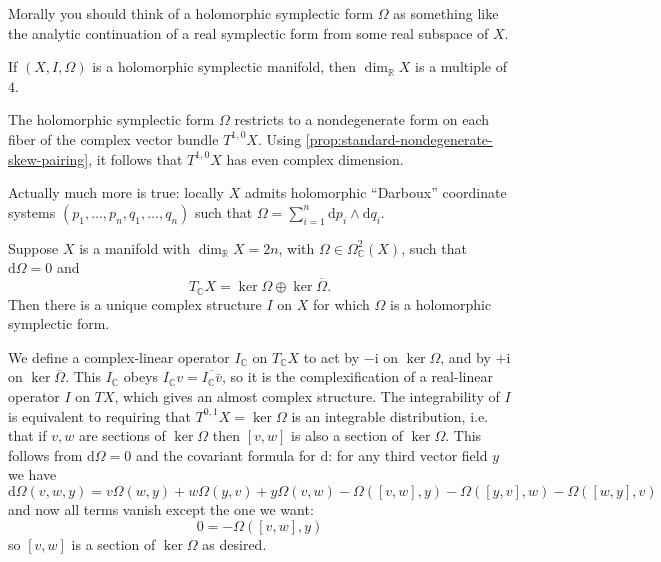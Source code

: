 \documentclass[12pt,letterpaper,reqno]{article}
\numberwithin{equation}{section}
\newcommand{\R}{\ensuremath{\mathbb R}}
\newcommand{\C}{\ensuremath{\mathbb C}}
\newcommand{\I}{{\mathrm i}}
\newcommand{\de}{\mathrm{d}}
\begin{document}
Morally you should think of a holomorphic symplectic form $\Omega$
as something like the analytic continuation of a real 
symplectic form from some real subspace of $X$.

\begin{prop} 
\label{prop:hol-symp-dimension-4n} If $(X,I,\Omega)$ is a holomorphic symplectic manifold,
then $\dim_\R X$ is a multiple of $4$.
\end{prop} 
\begin{pf} The holomorphic symplectic form $\Omega$ restricts to a nondegenerate form on each fiber of the complex vector 
bundle $T^{1,0} X$.
Using \autoref{prop:standard-nondegenerate-skew-pairing}, it follows
that $T^{1,0} X$ has even complex dimension.
\end{pf}

Actually much more is true: 
locally $X$ admits holomorphic ``Darboux'' coordinate systems
$(p_1, \dots, p_n, q_1, \dots, q_n)$
such that $\Omega = \sum_{i=1}^n \de p_i \wedge \de q_i$.

\begin{prop} \label{prop:hol-symp-to-complex}
Suppose $X$ is a manifold with $\dim_\R X = 2n$, 
with $\Omega \in \Omega^2_\C(X)$, such that $\de \Omega = 0$ and
\begin{equation}
 T_\C X = \ker \Omega \oplus \ker \overline\Omega. 
\end{equation}
Then there is a 
unique complex structure $I$ on $X$ for which $\Omega$
is a holomorphic symplectic form.
\end{prop}
\begin{pf} We define a complex-linear operator 
$I_\C$ on $T_\C X$ to act by $-\I$ on
$\ker \Omega$, and by $+\I$ on $\ker \overline\Omega$.
This $I_\C$ obeys $I_\C v = \overline{I_\C \bar{v}}$, so it is the 
complexification of a real-linear operator $I$ on $TX$,
which gives an almost complex structure.
The integrability of $I$ is equivalent to requiring
that $T^{0,1} X = \ker \Omega$ is an integrable distribution,
i.e. that if $v,w$ are sections of $\ker \Omega$ then $[v,w]$
is also a section of $\ker \Omega$.
This follows from $\de \Omega = 0$ and the covariant formula
for $\de$: for any third vector field $y$ we have
\begin{equation}
  \de \Omega(v,w,y) = v \Omega(w,y) + w \Omega(y,v) + y \Omega(v,w)
  - \Omega([v,w],y) - \Omega([y,v],w) - \Omega([w,y],v)
\end{equation}
and now all terms vanish except the one we want:
\begin{equation}
  0 = -\Omega([v,w],y)
\end{equation}
so $[v,w]$ is a section of $\ker \Omega$ as desired.
\end{pf}
\end{document}
